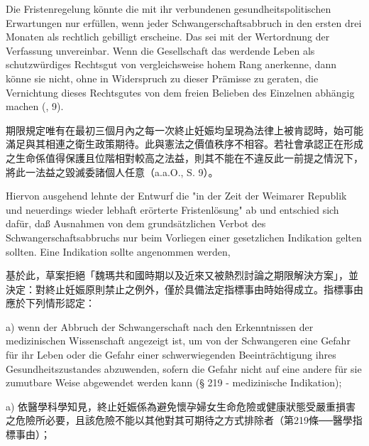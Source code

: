 \documentclass[12pt]{article}
\begin{document}
\syncleft
\begin{sourcepara}
Die Fristenregelung könnte die mit ihr verbundenen gesundheitspolitischen Erwartungen nur erfüllen, wenn jeder Schwangerschaftsabbruch in den ersten drei Monaten als rechtlich gebilligt erscheine. Das sei mit der Wertordnung der Verfassung unvereinbar. Wenn die Gesellschaft das werdende Leben als schutzwürdiges Rechtsgut von vergleichsweise hohem Rang anerkenne, dann könne sie nicht, ohne in Widerspruch zu dieser Prämisse zu geraten, die Vernichtung dieses Rechtsgutes von dem freien Belieben des Einzelnen abhängig machen (\abbrAAO{}, \abbrS{} 9).
\end{sourcepara}
\begin{transpara}
期限規定唯有在最初三個月內之每一次終止妊娠均呈現為法律上被肯認時，始可能滿足與其相連之衛生政策期待。此與憲法之價值秩序不相容。若社會承認正在形成之生命係值得保護且位階相對較高之法益，則其不能在不違反此一前提之情況下，將此一法益之毀滅委諸個人任意（a.a.O., S. 9）。
\end{transpara}

\syncleft
\begin{sourcepara}
Hiervon ausgehend lehnte der Entwurf die "in der Zeit der Weimarer Republik und neuerdings wieder lebhaft erörterte Fristenlösung" ab und entschied sich dafür, daß Ausnahmen von dem grundsätzlichen Verbot des Schwangerschaftsabbruchs nur beim Vorliegen einer gesetzlichen Indikation gelten sollten. Eine Indikation sollte angenommen werden,
\end{sourcepara}
\begin{transpara}
基於此，草案拒絕「魏瑪共和國時期以及近來又被熱烈討論之期限解決方案」，並決定：對終止妊娠原則禁止之例外，僅於具備法定指標事由時始得成立。指標事由應於下列情形認定：
\end{transpara}

\syncleft
\begin{sourcepara}
a) wenn der Abbruch der Schwangerschaft nach den Erkenntnissen der medizinischen Wissenschaft angezeigt ist, um von der Schwangeren eine Gefahr für ihr Leben oder die Gefahr einer schwerwiegenden Beeinträchtigung ihres Gesundheitszustandes abzuwenden, sofern die Gefahr nicht auf eine andere für sie zumutbare Weise abgewendet werden kann (§ 219 - medizinische Indikation);
\end{sourcepara}
\begin{transpara}
a) 依醫學科學知見，終止妊娠係為避免懷孕婦女生命危險或健康狀態受嚴重損害之危險所必要，且該危險不能以其他對其可期待之方式排除者（第219條──醫學指標事由）；
\end{transpara}
\end{document}
